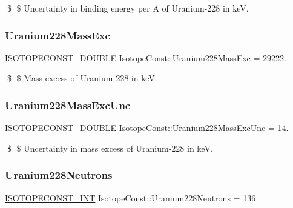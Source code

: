 \$ \$ Uncertainty in binding energy per A of Uranium-\/228 in keV. \mbox{\label{group___isotope_const-_uranium-_u228_gaee49d86b7ea59daad271e9e6b7fb6f26}} 
\subsubsection{\texorpdfstring{Uranium228\+Mass\+Exc}{Uranium228MassExc}}
{\footnotesize\ttfamily \mbox{\hyperlink{group___isotope_const-_macros_ga8f45a7272ce02c0b4c65c44636ed719a}{I\+S\+O\+T\+O\+P\+E\+C\+O\+N\+S\+T\+\_\+\+D\+O\+U\+B\+LE}} Isotope\+Const\+::\+Uranium228\+Mass\+Exc = 29222.}

\$ \$ Mass excess of Uranium-\/228 in keV. \mbox{\label{group___isotope_const-_uranium-_u228_gae5583e1be48539a7fec46907feb0b625}} 
\subsubsection{\texorpdfstring{Uranium228\+Mass\+Exc\+Unc}{Uranium228MassExcUnc}}
{\footnotesize\ttfamily \mbox{\hyperlink{group___isotope_const-_macros_ga8f45a7272ce02c0b4c65c44636ed719a}{I\+S\+O\+T\+O\+P\+E\+C\+O\+N\+S\+T\+\_\+\+D\+O\+U\+B\+LE}} Isotope\+Const\+::\+Uranium228\+Mass\+Exc\+Unc = 14.}

\$ \$ Uncertainty in mass excess of Uranium-\/228 in keV. \mbox{\label{group___isotope_const-_uranium-_u228_ga788617a1cc7e6740ad0af40ff0a6361f}} 
\subsubsection{\texorpdfstring{Uranium228\+Neutrons}{Uranium228Neutrons}}
{\footnotesize\ttfamily \mbox{\hyperlink{group___isotope_const-_macros_ga5f18360b3e99483a35c32d789e62621c}{I\+S\+O\+T\+O\+P\+E\+C\+O\+N\+S\+T\+\_\+\+I\+NT}} Isotope\+Const\+::\+Uranium228\+Neutrons = 136}

